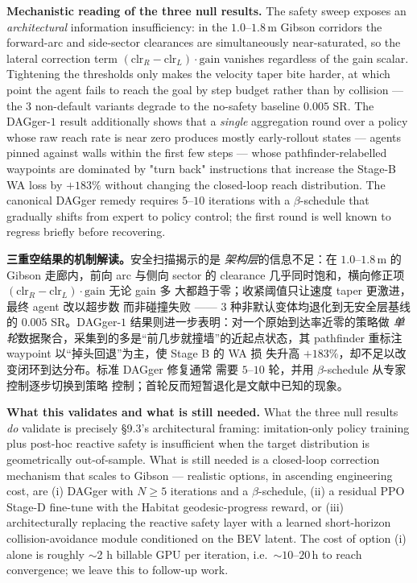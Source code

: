 \documentclass[11pt,a4paper]{article}
\newcommand{\en}[1]{\par\noindent #1\par\vspace{0.15em}}
\newcommand{\zh}[1]{\par\noindent\color{zhcol}\hspace{0.5em}#1\par\color{black}\vspace{0.6em}}
\begin{document}
\en{\textbf{Mechanistic reading of the three null results.}
The safety sweep exposes an \emph{architectural} information
insufficiency: in the $1.0$–$1.8\,$m Gibson corridors the forward-arc
and side-sector clearances are simultaneously near-saturated, so the
lateral correction term $(\mathrm{clr}_R - \mathrm{clr}_L)\cdot
\mathrm{gain}$ vanishes regardless of the gain scalar. Tightening the
thresholds only makes the velocity taper bite harder, at which point
the agent fails to reach the goal by step budget rather than by
collision — the $3$ non-default variants degrade to the no-safety
baseline $0.005$ SR. The DAGger-$1$ result additionally shows that a
\emph{single} aggregation round over a policy whose raw reach rate is
near zero produces mostly early-rollout states — agents pinned against
walls within the first few steps — whose pathfinder-relabelled
waypoints are dominated by "turn back" instructions that increase the
Stage-B WA loss by $+183\%$ without changing the closed-loop reach
distribution. The canonical DAGger remedy requires $5$–$10$ iterations
with a $\beta$-schedule that gradually shifts from expert to policy
control; the first round is well known to regress briefly before
recovering.}

\zh{\textsf{\textbf{三重空结果的机制解读。}安全扫描揭示的是
\emph{架构层}的信息不足：在 $1.0$–$1.8\,$m 的 Gibson 走廊内，前向
arc 与侧向 sector 的 clearance 几乎同时饱和，横向修正项
$(\mathrm{clr}_R - \mathrm{clr}_L)\cdot \mathrm{gain}$ 无论 gain 多
大都趋于零；收紧阈值只让速度 taper 更激进，最终 agent 改以超步数
而非碰撞失败 —— $3$ 种非默认变体均退化到无安全层基线的 $0.005$
SR。DAGger-$1$ 结果则进一步表明：对一个原始到达率近零的策略做
\emph{单轮}数据聚合，采集到的多是“前几步就撞墙”的近起点状态，其
pathfinder 重标注 waypoint 以“掉头回退”为主，使 Stage B 的 WA 损
失升高 $+183\%$，却不足以改变闭环到达分布。标准 DAGger 修复通常
需要 $5$–$10$ 轮，并用 $\beta$-schedule 从专家控制逐步切换到策略
控制；首轮反而短暂退化是文献中已知的现象。}}

\en{\textbf{What this validates and what is still needed.} What the
three null results \emph{do} validate is precisely \S9.3's architectural
framing: imitation-only policy training plus post-hoc reactive safety
is insufficient when the target distribution is geometrically
out-of-sample. What is still needed is a closed-loop correction
mechanism that scales to Gibson — realistic options, in ascending
engineering cost, are (i) DAGger with $N \ge 5$ iterations and a
$\beta$-schedule, (ii) a residual PPO Stage-D fine-tune with the
Habitat geodesic-progress reward, or (iii) architecturally replacing
the reactive safety layer with a learned short-horizon
collision-avoidance module conditioned on the BEV latent. The cost of
option (i) alone is roughly $\sim$2 h billable GPU per iteration,
i.e.\ $\sim 10$–$20\,$h to reach convergence; we leave this to
follow-up work.}
\end{document}

